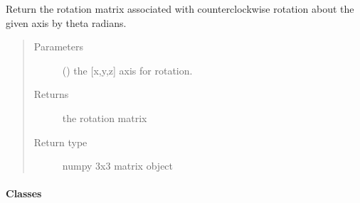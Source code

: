 \documentclass[a4paper,10pt,english,openany,oneside]{sphinxmanual}
\begin{document}
\begin{fulllineitems}
\label{\detokenize{reference/generated/paramagpy.protein.rotation_matrix:paramagpy.protein.rotation_matrix}}
Return the rotation matrix associated with counterclockwise
rotation about the given axis by theta radians.
\begin{quote}\begin{description}
\item[{Parameters}] \leavevmode
{} () \textendash{} the {[}x,y,z{]} axis for rotation.

\item[{Returns}] \leavevmode
{} \textendash{} the rotation matrix

\item[{Return type}] \leavevmode
numpy 3x3 matrix object

\end{description}\end{quote}

\end{fulllineitems}



\paragraph{Classes}
\label{\detokenize{reference/protein:classes}}
\end{document}
